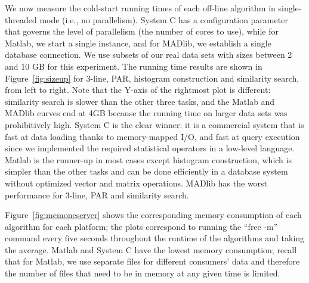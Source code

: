 \documentclass[prodmode,acmtods]{acmsmall}
\begin{document}
We now measure the cold-start running times of each off-line algorithm in single-threaded mode (i.e., no parallelism).  System C has a configuration parameter that governs the level of parallelism (the number of cores to use), while for Matlab, we start a single instance, and for MADlib, we establish a single database connection.  We use subsets of our real data sets with sizes between 2 and 10 GB for this experiment.  The running time results are shown in Figure~\ref{fig:sizeup} for 3-line, PAR, histogram construction and similarity search, from left to right.  Note that the Y-axis of the rightmost plot is different: similarity search is slower than the other three tasks, and the Matlab and MADlib curves end at 4GB because the running time on larger data sets was prohibitively high.  System C is the clear winner: it is a commercial system that is fast at data loading thanks to memory-mapped I/O, and fast at query execution since we implemented the required statistical operators in a low-level language.  Matlab is the runner-up in most cases except histogram construction, which is simpler than the other tasks and can be done efficiently in a database system without optimized vector and matrix operations.  MADlib has the worst performance for 3-line, PAR and similarity search.  

\begin{figure*}[t]
 \centering
 \caption{Single-threaded execution times of each algorithm using each system.}
   \label{fig:sizeup}
\end{figure*}

Figure~\ref{fig:memoneserver} shows the corresponding memory consumption of each algorithm for each platform; the plots correspond to running the ``free -m'' command every five seconds throughout the runtime of the algorithms and taking the average.  Matlab and System C have the lowest memory consumption; recall that for Matlab, we use separate files for different consumers' data and therefore the number of files that need to be in memory at any given time is limited.  
\end{document}
